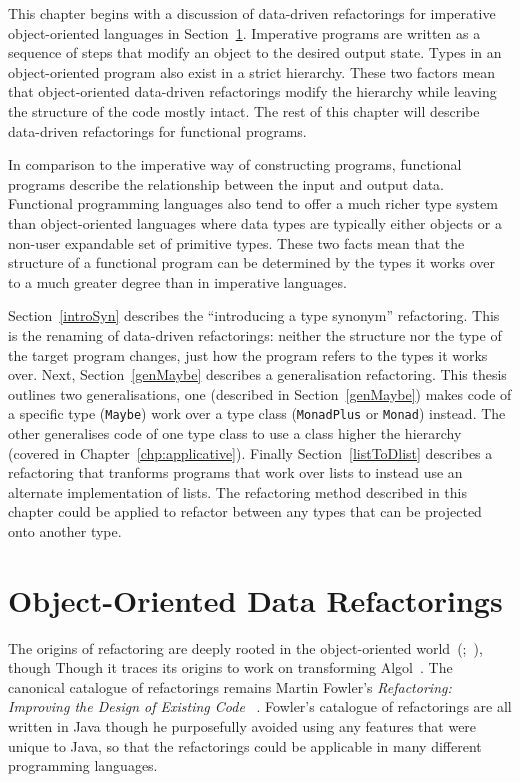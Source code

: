 This chapter begins with a discussion of data-driven refactorings for imperative object-oriented languages in Section~\ref{ooRefs}. Imperative programs are written as a sequence of steps that modify an object to the desired output state. Types in an object-oriented program also exist in a strict hierarchy. These two factors mean that object-oriented data-driven refactorings modify the hierarchy while leaving the structure of the code mostly intact. The rest of this chapter will describe data-driven refactorings for functional programs.

In comparison to the imperative way of constructing programs, functional programs describe the relationship between the input and output data. Functional programming languages also tend to offer a much richer type system than object-oriented languages where data types are typically either objects or a non-user expandable set of primitive types. These two facts mean that the structure of a functional program can be determined by the types it works over to a much greater degree than in imperative languages. 

Section~\ref{introSyn} describes the ``introducing a type synonym'' refactoring. This is the renaming of data-driven refactorings: neither the structure nor the type of the target program changes, just how the program refers to the types it works over. Next, Section~\ref{genMaybe} describes a generalisation refactoring. This thesis outlines two generalisations, one (described in Section~\ref{genMaybe}) makes code of a specific type (\texttt{Maybe}) work over a type class (\texttt{MonadPlus} or \texttt{Monad}) instead. The other generalises code of one type class to use a class higher the hierarchy (covered in Chapter~\ref{chp:applicative}). Finally Section~\ref{listToDlist} describes a refactoring that tranforms programs that work over lists to instead use an alternate implementation of lists. The refactoring method described in this chapter could be applied to refactor between any types that can be projected onto another type.

\section{Object-Oriented Data Refactorings}\label{ooRefs}

The origins of refactoring are deeply rooted in the object-oriented world~(\cite{programRestructuring};~\cite{refactOOFrameworks}), though Though it traces its origins to work on transforming Algol~\citep{recursiveTransformation}. The canonical catalogue of refactorings remains Martin Fowler's \emph{Refactoring: Improving the Design of Existing Code} ~\citep{fowler}. Fowler's catalogue of refactorings are all written in Java though he purposefully avoided using any features that were unique to Java, so that the refactorings could be applicable in many different programming languages.


